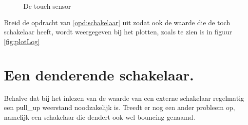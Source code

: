 \begin{enumerate}[label=\alph*)]
\begin{figure}[H]
\begin{subfigure}[b]{0.64\textwidth}
\end{subfigure}		
		\captionsetup{justification=centering}
	\caption{De touch sensor }
		\label{fig:Logo}

\end{figure}
Breid de opdracht van \ref{opd:schakelaar} uit zodat ook de waarde die de toch schakelaar heeft, wordt weergegeven bij het plotten, zoals te zien is in figuur \ref{fig:plotLog}
\end{enumerate}

\section{Een denderende schakelaar.}

Behalve dat bij het inlezen van de waarde van een externe schakelaar regelmatig een pull\_up weerstand noodzakelijk is. 
Treedt er nog een ander probleem op, namelijk een schakelaar die dendert ook wel bouncing genaamd.

